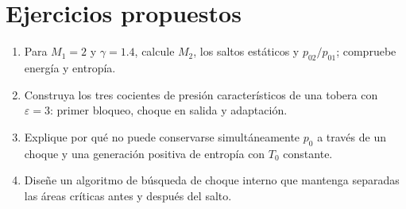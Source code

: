 \section{Ejercicios propuestos}
\begin{enumerate}
\item Para $M_1=2$ y $\gamma=1.4$, calcule $M_2$, los saltos estáticos y $p_{02}/p_{01}$; compruebe energía y entropía.
\item Construya los tres cocientes de presión característicos de una tobera con $\varepsilon=3$: primer bloqueo, choque en salida y adaptación.
\item Explique por qué no puede conservarse simultáneamente $p_0$ a través de un choque y una generación positiva de entropía con $T_0$ constante.
\item Diseñe un algoritmo de búsqueda de choque interno que mantenga separadas las áreas críticas antes y después del salto.
\end{enumerate}


\studiumchaptercheck

